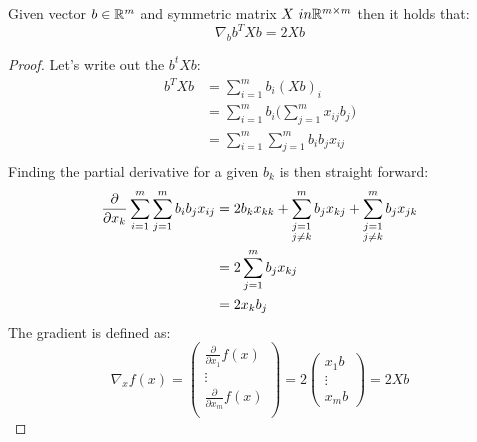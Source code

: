 \begin{prop}
Given vector $b \in \mathbb{R}^m$ and symmetric matrix 
$X \ in \mathbb{R}^{m \times m}$ then it holds that:
\begin{equation}
\nabla_b b^TXb = 2Xb
\end{equation}
\end{prop}
\begin{proof}
Let's write out the $b^tXb$:
\begin{equation}
\begin{split}
b^T X b &= \sum_{i=1}^{m} b_i (Xb)_i\\
&= \sum_{i=1}^{m} b_i \big( \sum_{j=1}^{m} x_{ij}b_j\big)\\
&= \sum_{i=1}^{m}\sum_{j=1}^{m} b_i b_j x_{ij}\\
\end{split}
\end{equation}
Finding the partial derivative for a given $b_k$ is then
straight forward:
\begin{equation}
\begin{split}
\frac{\partial}{\partial x_k}
	\sum_{i=1}^{m}\sum_{j=1}^{m} b_i b_j x_{ij} 
	&= 
	  2b_kx_{kk} 
	+ \sum_{\substack{j=1\\ j\neq k}}^{m} b_jx_{kj} 
	+ \sum_{\substack{j=1\\ j\neq k}}^{m} b_jx_{jk} 
\\&=
	2\sum_{j=1}^{m} b_jx_{kj}
\\&=
	2x_kb_j
\end{split}
\end{equation}
The gradient is defined as:
\begin{equation}
\nabla_x f(x)= 
\begin{pmatrix}
\frac{\partial}{\partial x_1} f(x)\\
\vdots \\
\frac{\partial}{\partial x_m} f(x)\\
\end{pmatrix}
=2
\begin{pmatrix}
x_1 b\\
\vdots \\
x_m b
\end{pmatrix}
=
2Xb
\end{equation}
\end{proof}

